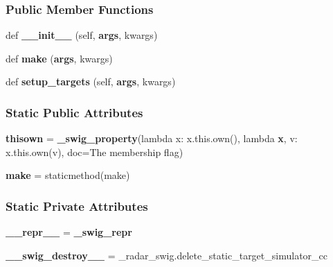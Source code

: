 \subsubsection*{Public Member Functions}
\begin{DoxyCompactItemize}
\item 
def {\bf \+\_\+\+\_\+init\+\_\+\+\_\+} (self, {\bf args}, kwargs)
\item 
def {\bf make} ({\bf args}, kwargs)
\item 
def {\bf setup\+\_\+targets} (self, {\bf args}, kwargs)
\end{DoxyCompactItemize}
\subsubsection*{Static Public Attributes}
\begin{DoxyCompactItemize}
\item 
{\bf thisown} = {\bf \+\_\+swig\+\_\+property}(lambda x\+: x.\+this.\+own(), lambda {\bf x}, v\+: x.\+this.\+own(v), doc=\textquotesingle{}The membership flag\textquotesingle{})
\item 
{\bf make} = staticmethod(make)
\end{DoxyCompactItemize}
\subsubsection*{Static Private Attributes}
\begin{DoxyCompactItemize}
\item 
{\bf \+\_\+\+\_\+repr\+\_\+\+\_\+} = {\bf \+\_\+swig\+\_\+repr}
\item 
{\bf \+\_\+\+\_\+swig\+\_\+destroy\+\_\+\+\_\+} = \+\_\+radar\+\_\+swig.\+delete\+\_\+static\+\_\+target\+\_\+simulator\+\_\+cc
\end{DoxyCompactItemize}


